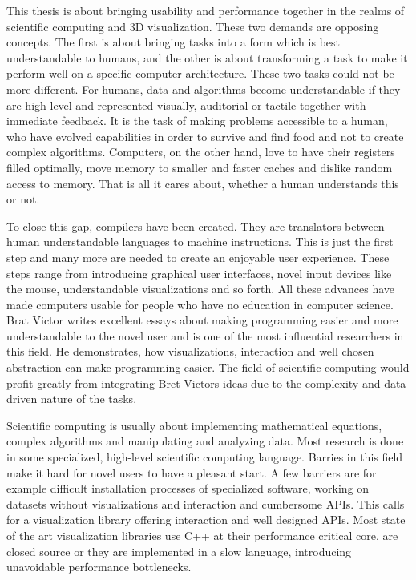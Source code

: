 This thesis is about bringing usability and performance together in the realms of scientific computing and 3D visualization.
These two demands are opposing concepts.
The first is about bringing tasks into a form which is best understandable to humans, and the other is about transforming a task to make it perform well on a specific computer architecture.
These two tasks could not be more different. 
For humans, data and algorithms become understandable if they are high-level and represented visually, auditorial or tactile together with immediate feedback. 
It is the task of making problems accessible to a human, who have evolved capabilities in order to survive and find food and not to create complex algorithms.
Computers, on the other hand, love to have their registers filled optimally, move memory to smaller and faster caches and dislike random access to memory. That is all it cares about, whether a human understands this or not.

To close this gap, compilers have been created. They are translators between human understandable languages to machine instructions.
This is just the first step and many more are needed to create an enjoyable user experience.
These steps range from introducing graphical user interfaces, novel input devices like the mouse, understandable visualizations and so forth.
All these advances have made computers usable for people who have no education in computer science.
Brat Victor writes excellent essays about making programming easier and more understandable to the novel user and is one of the most influential researchers in this field.
He demonstrates, how visualizations, interaction and well chosen abstraction can make programming easier\cite{BretVictorLP}\cite{BretVictorLA}.
The field of scientific computing would profit greatly from integrating Bret Victors ideas due to the complexity and data driven nature of the tasks.

Scientific computing is usually about implementing mathematical equations, complex algorithms and manipulating and analyzing data.
Most research is done in some specialized, high-level scientific computing language\cite{DBLP:journals/corr/abs-1209-5145}.
Barries in this field make it hard for novel users to have a pleasant start.
A few barriers are for example difficult installation processes of specialized software, working on datasets without visualizations and interaction and cumbersome \ac{API}s.
This calls for a visualization library offering interaction and well designed \ac{API}s.
Most state of the art visualization libraries use C++ at their performance critical core, are closed source or they are implemented in a slow language, introducing unavoidable performance bottlenecks.

